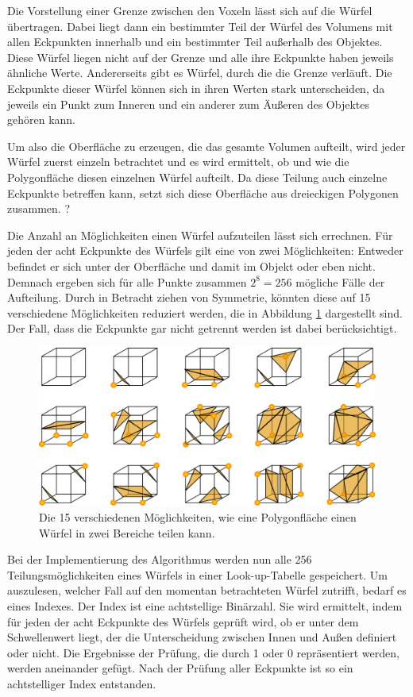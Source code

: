 Die Vorstellung einer Grenze zwischen den Voxeln lässt sich auf die Würfel übertragen. Dabei liegt dann ein bestimmter Teil der Würfel des Volumens mit allen Eckpunkten innerhalb und ein bestimmter Teil außerhalb des Objektes. Diese Würfel liegen nicht auf der Grenze und alle ihre Eckpunkte haben jeweils ähnliche Werte. Andererseits gibt es Würfel, durch die die Grenze verläuft. Die Eckpunkte dieser Würfel können sich in ihren Werten stark unterscheiden, da jeweils ein Punkt zum Inneren und ein anderer zum Äußeren des Objektes gehören kann. 

Um also die Oberfläche zu erzeugen, die das gesamte Volumen aufteilt, wird jeder Würfel zuerst einzeln betrachtet und es wird ermittelt, ob und wie die Polygonfläche diesen einzelnen Würfel aufteilt.  Da diese Teilung auch einzelne Eckpunkte betreffen kann, setzt sich diese Oberfläche aus dreieckigen Polygonen zusammen. ?

Die Anzahl an Möglichkeiten einen Würfel aufzuteilen lässt sich errechnen. Für jeden der acht Eckpunkte des Würfels gilt eine von zwei Möglichkeiten: Entweder befindet er sich unter der Oberfläche und damit im Objekt oder eben nicht. Demnach ergeben sich für alle Punkte zusammen $2^8=256$ mögliche Fälle der Aufteilung. \cite{aigner07} Durch in Betracht ziehen von Symmetrie, könnten diese auf 15 verschiedene Möglichkeiten reduziert werden, die in Abbildung \ref{img:marchingCubes} dargestellt sind. Der Fall, dass die Eckpunkte gar nicht getrennt werden ist dabei berücksichtigt. 

\begin{figure}
	\centering
	\includegraphics[width=0.7\linewidth]{images/MarchingCubes.png}
	\caption{Die 15 verschiedenen Möglichkeiten, wie eine Polygonfläche einen Würfel in zwei Bereiche teilen kann.}
	\label{img:marchingCubes}
\end{figure}

Bei der Implementierung des Algorithmus werden nun alle 256 Teilungsmöglichkeiten eines Würfels in einer Look-up-Tabelle gespeichert. Um auszulesen, welcher Fall auf den momentan betrachteten Würfel zutrifft, bedarf es eines Indexes. 
Der Index ist eine achtstellige Binärzahl. Sie wird ermittelt, indem für jeden der acht Eckpunkte des Würfels geprüft wird, ob er unter dem Schwellenwert liegt, der die Unterscheidung zwischen Innen und Außen definiert oder nicht. Die Ergebnisse der Prüfung, die durch 1 oder 0 repräsentiert werden, werden aneinander gefügt. Nach der Prüfung aller Eckpunkte ist so ein achtstelliger Index entstanden. 

